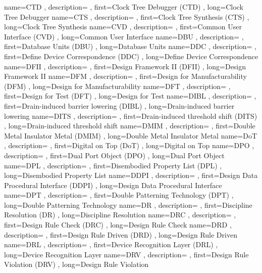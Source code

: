 { name={CTD}
, description={}
, first={Clock Tree Debugger (CTD)}
, long={Clock Tree Debugger}
}
{ name={CTS}
, description={}
, first={Clock Tree Synthesis (CTS)}
, long={Clock Tree Synthesis}
}
{ name={CVD}
, description={}
, first={Common User Interface (CVD)}
, long={Common User Interface}
}
{ name={DBU}
, description={}
, first={Database Units (DBU)}
, long={Database Units}
}
{ name={DDC}
, description={}
, first={Define Device Correspondence (DDC)}
, long={Define Device Correspondence}
}
{ name={DFII}
, description={}
, first={Design Framework II (DFII)}
, long={Design Framework II}
}
{ name={DFM}
, description={}
, first={Design for Manufacturability (DFM)}
, long={Design for Manufacturability}
}
{ name={DFT}
, description={}
, first={Design for Test (DFT)}
, long={Design for Test}
}
{ name={DIBL}
, description={}
, first={Drain-induced barrier lowering (DIBL)}
, long={Drain-induced barrier lowering}
}
{ name={DITS}
, description={}
, first={Drain-induced threshold shift (DITS)}
, long={Drain-induced threshold shift}
}
{ name={DMIM}
, description={}
, first={Double Metal Insulator Metal (DMIM)}
, long={Double Metal Insulator Metal}
}
{ name={DoT}
, description={}
, first={Digital on Top (DoT)}
, long={Digital on Top}
}
{ name={DPO}
, description={}
, first={Dual Port Object (DPO)}
, long={Dual Port Object}
}
{ name={DPL}
, description={}
, first={Disembodied Property List (DPL)}
, long={Disembodied Property List}
}
{ name={DDPI}
, description={}
, first={Design Data Procedural Interface (DDPI)}
, long={Design Data Procedural Interface}
}
{ name={DPT}
, description={}
, first={Double Patterning Technology (DPT)}
, long={Double Patterning Technology}
}
{ name={DR}
, description={}
, first={Discipline Resolution (DR)}
, long={Discipline Resolution}
}
{ name={DRC}
, description={}
, first={Design Rule Check (DRC)}
, long={Design Rule Check}
}
{ name={DRD}
, description={}
, first={Design Rule Driven (DRD)}
, long={Design Rule Driven}
}
{ name={DRL}
, description={}
, first={Device Recognition Layer (DRL)}
, long={Device Recognition Layer}
}
{ name={DRV}
, description={}
, first={Design Rule Violation (DRV)}
, long={Design Rule Violation}
}
